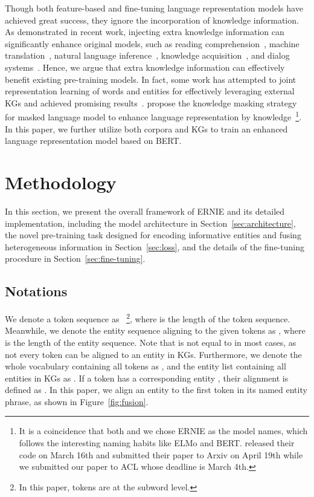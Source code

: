 \documentclass[11pt,a4paper]{article}
\begin{document}
Though both feature-based and fine-tuning language representation models have achieved great success, they ignore the incorporation of knowledge information. As demonstrated in recent work, injecting extra knowledge information can significantly enhance original models, such as reading comprehension~\cite{mihaylov2018knowledgeable,zhong2018improving}, machine translation~\cite{zaremoodi2018adaptive}, natural language inference~\cite{chen2018neural}, knowledge acquisition~\cite{han2018neural}, and dialog systems~\cite{madotto2018mem2seq}. Hence, we argue that extra knowledge information can effectively benefit existing pre-training models. In fact, some work has attempted to joint representation learning of words and entities for effectively leveraging external KGs and achieved promising results~\cite{wang2014knowledge,toutanova2015representing,han2016joint,yamada2016joint,cao2017bridge,cao2018joint}.  propose the knowledge masking strategy for masked language model to enhance language representation by knowledge~\footnote{It is a coincidence that both  and we chose ERNIE as the model names, which follows the interesting naming habits like ELMo and BERT.  released their code on March 16th and submitted their paper to Arxiv on April 19th while we submitted our paper to ACL whose deadline is March 4th.}. In this paper, we further utilize both corpora and KGs to train an enhanced language representation model based on BERT.

\section{Methodology}

In this section, we present the overall framework of ERNIE and its detailed implementation, including the model architecture in Section~\ref{sec:architecture}, the novel pre-training task designed for encoding informative entities and fusing heterogeneous information in Section~\ref{sec:loss}, and the details of the fine-tuning procedure in Section~\ref{sec:fine-tuning}.

\subsection{Notations}

We denote a token sequence as ~\footnote{In this paper, tokens are at the subword level.}, where  is the length of the token sequence. Meanwhile, we denote the entity sequence aligning to the given tokens as , where  is the length of the entity sequence. Note that  is not equal to  in most cases, as not every token can be aligned to an entity in KGs. Furthermore, we denote the whole vocabulary containing all tokens as , and the entity list containing all entities in KGs as . If a token  has a corresponding entity , their alignment is defined as . In this paper, we align an entity to the first token in its named entity phrase, as shown in Figure~\ref{fig:fusion}.
\end{document}
